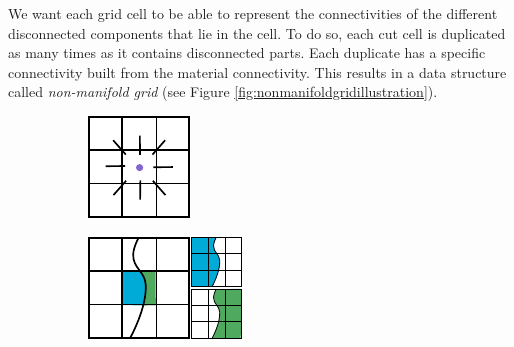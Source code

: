 We want each grid cell to be able to represent  the connectivities of the different disconnected components that lie in the cell. To do so, each cut cell is duplicated as many times as it contains disconnected parts. Each duplicate has a specific connectivity built from the material connectivity. This results in a data structure called \emph{non-manifold grid} (see Figure \ref{fig:nonmanifoldgridillustration}).

\begin{figure}[!h]
	\centering
	\begin{subfigure}[b]{0.20\linewidth}
		\centering
		\includegraphics[width=\linewidth]{images/cutting-mig2015/connectivity.pdf}
		\caption{\label{fig:connectivity}}
	\end{subfigure}
	\hfill
	\begin{subfigure}[b]{0.30\linewidth}
		\centering
		\includegraphics[width=\linewidth]{images/cutting-mig2015/simple_cut.pdf}

\end{subfigure}
\end{figure}
